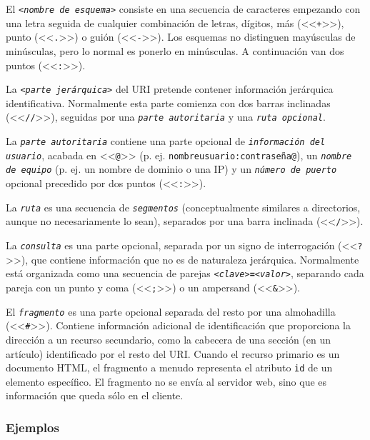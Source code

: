 \documentclass[a4paper,11pt]{memoir}
\begin{document}
El \texttt{\emph{<nombre de esquema>}} consiste en una secuencia de
caracteres empezando con una letra seguida de cualquier combinación
de letras, dígitos, más (<<\texttt{+}>>), punto (<<\texttt{.}>>)
o guión (<<\texttt{-}>>). Los esquemas no distinguen mayúsculas de
minúsculas, pero lo normal es ponerlo en minúsculas. A continuación
van dos puntos (<<\texttt{:}>>).

La \texttt{\emph{<parte jerárquica>}} del URI pretende contener información
jerárquica identificativa. Normalmente esta parte comienza con dos
barras inclinadas (<<\texttt{//}>>), seguidas por una \texttt{\emph{parte autoritaria}}
y una \emph{\texttt{ruta opcional}}.

La \emph{\texttt{parte autoritaria}} contiene una parte opcional de
\emph{\texttt{información del usuario}}, acabada en <<\texttt{@}>>
(p. ej. \texttt{nombreusuario:contraseña@}), un \emph{\texttt{nombre de equipo}}
(p. ej. un nombre de dominio o una IP) y un \emph{\texttt{número de puerto}}
opcional precedido por dos puntos (<<\texttt{:}>>).

La \texttt{\emph{ruta}} es una secuencia de \texttt{\emph{segmentos}}
(conceptualmente similares a directorios, aunque no necesariamente
lo sean), separados por una barra inclinada (<<\texttt{/}>>).

La \texttt{\emph{consulta}} es una parte opcional, separada por un
signo de interrogación (<<\texttt{?}>>), que contiene información
que no es de naturaleza jerárquica. Normalmente está organizada como
una secuencia de parejas \texttt{\emph{<clave>}\textbf{=}\emph{<valor>}},
separando cada pareja con un punto y coma (<<\texttt{;}>>) o un ampersand
(<<\texttt{\&}>>).

El \texttt{\emph{fragmento}} es una parte opcional separada del resto
por una almohadilla (<<\texttt{\#}>>). Contiene información adicional
de identificación que proporciona la dirección a un recurso secundario,
como la cabecera de una sección (en un artículo) identificado por
el resto del URI. Cuando el recurso primario es un documento HTML,
el fragmento a menudo representa el atributo \texttt{id} de un elemento
específico. El fragmento no se envía al servidor web, sino que es
información que queda sólo en el cliente.

\subsubsection{Ejemplos}
\end{document}
